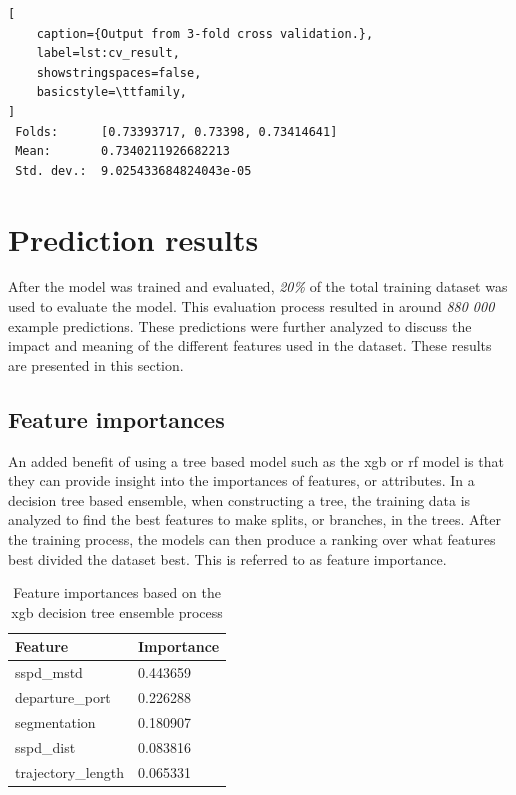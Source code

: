 \begin{lstlisting}[
    caption={Output from 3-fold cross validation.},
    label=lst:cv_result,
    showstringspaces=false,
    basicstyle=\ttfamily,
]
 Folds:      [0.73393717, 0.73398, 0.73414641]
 Mean:       0.7340211926682213
 Std. dev.:  9.025433684824043e-05
\end{lstlisting}

\section{Prediction results}

After the model was trained and evaluated, \textit{20\%} of the total training dataset was used to evaluate the model. This evaluation process resulted in around \textit{880 000} example predictions. These predictions were further analyzed to discuss the impact and meaning of the different features used in the dataset. These results are presented in this section.

\subsection{Feature importances}

An added benefit of using a tree based model such as the \acrfull{xgb} or \acrfull{rf} model is that they can provide insight into the importances of features, or attributes. In a decision tree based ensemble, when constructing a tree, the training data is analyzed to find the best features to make splits, or branches, in the trees. After the training process, the models can then produce a ranking over what features best divided the dataset best. This is referred to as feature importance.

\begin{table}[htbp]
    \centering
    \begin{tabularx}{0.6\textwidth}{X X}
        \bfseries{Feature} & \bfseries{Importance} \\ \toprule
        sspd\_mstd         & 0.443659 \\ \midrule
        departure\_port    & 0.226288 \\ \midrule
        segmentation       & 0.180907 \\ \midrule
        sspd\_dist         & 0.083816 \\ \midrule
        trajectory\_length & 0.065331 \\ \bottomrule
    \end{tabularx}
    \caption{Feature importances based on the \acrshort{xgb} decision tree ensemble process}\label{tab:feature_importances}
\end{table}

